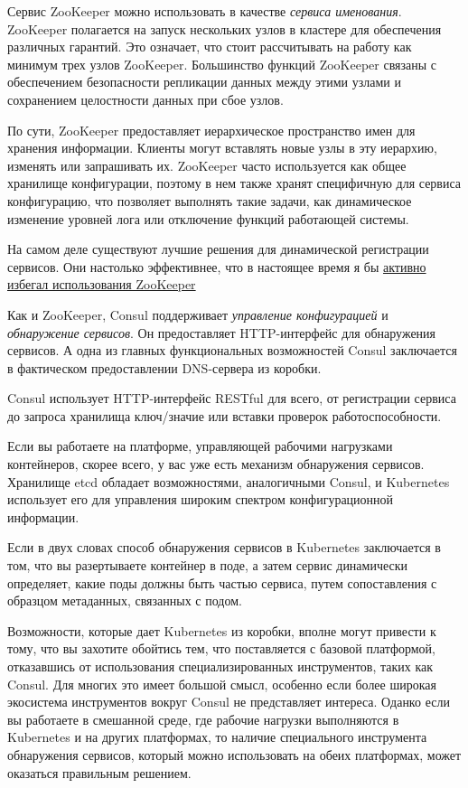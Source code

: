 \documentclass[%
	11pt,
	a4paper,
	utf8,
		]{article}
\begin{document}
Сервис ZooKeeper можно использовать в качестве \emph{сервиса именования}. ZooKeeper полагается на запуск нескольких узлов в кластере для обеспечения различных гарантий. Это означает, что стоит рассчитывать на работу как минимум трех узлов ZooKeeper. Большинство функций ZooKeeper связаны с обеспечением безопасности репликации данных между этими узлами и сохранением целостности данных при сбое узлов.

По сути, ZooKeeper предоставляет иерархическое пространство имен для хранения информации. Клиенты могут вставлять новые узлы в эту иерархию, изменять или запрашивать их. ZooKeeper часто используется как общее хранилище конфигурации, поэтому в нем также хранят специфичную для сервиса конфигурацию, что позволяет выполнять такие задачи, как динамическое изменение уровней лога или отключение функций работающей системы.

{\color{red} На самом деле существуют лучшие решения для динамической регистрации сервисов. Они настолько эффективнее, что в настоящее время я бы \underline{активно избегал использования ZooKeeper}}

Как и ZooKeeper, Consul поддерживает \emph{управление конфигурацией} и \emph{обнаружение сервисов}. Он предоставляет HTTP-интерфейс для обнаружения сервисов. А одна из главных функциональных возможностей Consul заключается в фактическом предоставлении DNS-сервера из коробки.

Consul использует HTTP-интерфейс RESTful для всего, от регистрации сервиса до запроса хранилища ключ/значие или вставки проверок работоспособности.

Если вы работаете на платформе, управляющей рабочими нагрузками контейнеров, скорее всего, у вас уже есть механизм обнаружения сервисов. Хранилище etcd обладает возможностями, аналогичными Consul, и Kubernetes использует его для управления широким спектром конфигурационной информации.

Если в двух словах способ обнаружения сервисов в Kubernetes заключается в том, что вы разертываете контейнер в поде, а затем сервис динамически определяет, какие поды должны быть частью сервиса, путем сопоставления с образцом метаданных, связанных с подом.

Возможности, которые дает Kubernetes из коробки, вполне могут привести к тому, что вы захотите обойтись тем, что поставляется с базовой платформой, отказавшись от использования специализированных инструментов, таких как Consul. Для многих это имеет большой смысл, особенно если более широкая экосистема инструментов вокруг Consul не представляет интереса. Оданко если вы работаете в смешанной среде, где рабочие нагрузки выполняются в Kubernetes и на других платформах, то наличие специального инструмента обнаружения сервисов, который можно использовать на обеих платформах, может оказаться правильным решением.
\end{document}
